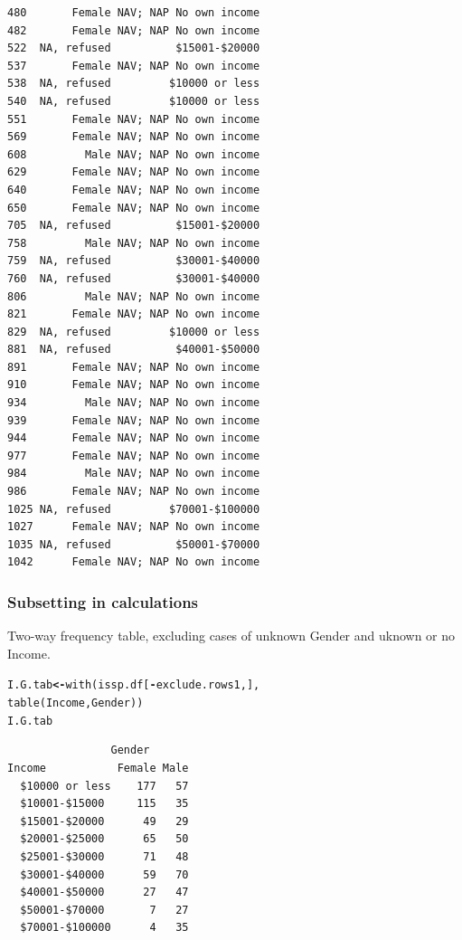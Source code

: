 \documentclass{beamer}\usepackage[]{graphicx}\usepackage[]{color}
\makeatletter
\newcommand{\hlopt}[1]{\textcolor[rgb]{0,0,0}{\textbf{#1}}}%
\newcommand{\hlstd}[1]{\textcolor[rgb]{0,0,0}{#1}}%
\newcommand{\hlkwb}[1]{\textcolor[rgb]{0,0,0.4}{\textbf{#1}}}%
\newcommand{\hlkwd}[1]{\textcolor[rgb]{0,0.267,0.4}{#1}}%
\newenvironment{kframe}{%
 \def\at@end@of@kframe{}%
 \ifinner\ifhmode%
  \def\at@end@of@kframe{\end{minipage}}%
  \begin{minipage}{\columnwidth}%
 \fi\fi%
 \def\FrameCommand##1{\hskip\@totalleftmargin \hskip-\fboxsep
 \colorbox{shadecolor}{##1}\hskip-\fboxsep
     \hskip-\linewidth \hskip-\@totalleftmargin \hskip\columnwidth}%
 \MakeFramed {\advance\hsize-\width
   \@totalleftmargin\z@ \linewidth\hsize
   \@setminipage}}%
 {\par\unskip\endMakeFramed%
 \at@end@of@kframe}
\newenvironment{knitrout}{}{} %
\makeatother
\begin{document}
\begin{frame}[fragile]
\begin{knitrout}
\begin{kframe}
\begin{verbatim}
480       Female NAV; NAP No own income
482       Female NAV; NAP No own income
522  NA, refused          $15001-$20000
537       Female NAV; NAP No own income
538  NA, refused         $10000 or less
540  NA, refused         $10000 or less
551       Female NAV; NAP No own income
569       Female NAV; NAP No own income
608         Male NAV; NAP No own income
629       Female NAV; NAP No own income
640       Female NAV; NAP No own income
650       Female NAV; NAP No own income
705  NA, refused          $15001-$20000
758         Male NAV; NAP No own income
759  NA, refused          $30001-$40000
760  NA, refused          $30001-$40000
806         Male NAV; NAP No own income
821       Female NAV; NAP No own income
829  NA, refused         $10000 or less
881  NA, refused          $40001-$50000
891       Female NAV; NAP No own income
910       Female NAV; NAP No own income
934         Male NAV; NAP No own income
939       Female NAV; NAP No own income
944       Female NAV; NAP No own income
977       Female NAV; NAP No own income
984         Male NAV; NAP No own income
986       Female NAV; NAP No own income
1025 NA, refused         $70001-$100000
1027      Female NAV; NAP No own income
1035 NA, refused          $50001-$70000
1042      Female NAV; NAP No own income
\end{verbatim}
\end{kframe}
\end{knitrout}
\end{frame}

\begin{frame}[fragile]
\frametitle{Subsetting in calculations} 
Two-way frequency table, excluding cases of unknown Gender and uknown or no Income.
\begin{knitrout}
\color{fgcolor}\begin{kframe}
\begin{alltt}
\hlstd{I.G.tab} \hlkwb{<-} \hlkwd{with}\hlstd{(issp.df[}\hlopt{-}\hlstd{exclude.rows1, ],}
                \hlkwd{table}\hlstd{(Income, Gender))}
\hlstd{I.G.tab}
\end{alltt}
\begin{verbatim}
                Gender
Income           Female Male
  $10000 or less    177   57
  $10001-$15000     115   35
  $15001-$20000      49   29
  $20001-$25000      65   50
  $25001-$30000      71   48
  $30001-$40000      59   70
  $40001-$50000      27   47
  $50001-$70000       7   27
  $70001-$100000      4   35
\end{verbatim}
\end{kframe}
\end{knitrout}
\end{frame}
\end{document}
